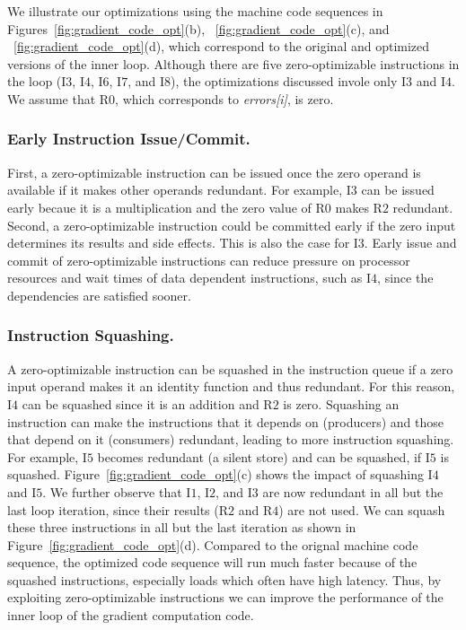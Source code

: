We illustrate our optimizations using the machine code sequences in  Figures~\ref{fig:gradient_code_opt}(b), ~\ref{fig:gradient_code_opt}(c), and ~\ref{fig:gradient_code_opt}(d), which correspond to the original and optimized versions of the inner loop.  Although there are five zero-optimizable instructions in the loop (I$3$, I$4$, I$6$, I$7$, and I$8$), the optimizations discussed invole only I$3$ and I$4$. We assume that R$0$, which corresponds to \emph{errors[i]}, is zero. 


\subsubsection{Early Instruction Issue/Commit.}  First, a zero-optimizable instruction can be issued once the zero operand is available if it makes other operands redundant.  For example, I$3$ can be issued early becaue it is a multiplication and the zero value of R$0$ makes R$2$ redundant.  Second, a zero-optimizable instruction could be committed early if the zero input determines its results and side effects. This is also the case for I$3$. Early issue and commit of zero-optimizable instructions can reduce pressure on processor resources and wait times of data dependent instructions, such as I$4$, since the dependencies are satisfied sooner. 

\subsubsection{Instruction Squashing.} A zero-optimizable instruction can be squashed in the instruction queue if a zero input operand makes it an identity function and thus redundant. For this reason, I$4$ can be squashed since it is an addition and R$2$ is zero. Squashing an instruction can make the  instructions that it depends on (producers) and those that depend on it (consumers) redundant, leading to more instruction squashing.  For example, I$5$ becomes redundant (a silent store) and can be squashed, if I$5$ is squashed. Figure~\ref{fig:gradient_code_opt}(c) shows the impact of squashing I$4$ and I$5$.  We further observe that  I$1$, I$2$, and I$3$ are now redundant in all but the last loop iteration, since their results (R$2$ and R$4$) are not used.  We can squash these three instructions in all but the last iteration as shown in Figure~\ref{fig:gradient_code_opt}(d). Compared to the orignal machine code sequence, the optimized code sequence will run much faster because of the squashed instructions, especially loads which often have high latency.  Thus, by exploiting zero-optimizable instructions we can improve the performance of the inner loop of the gradient computation code. 

